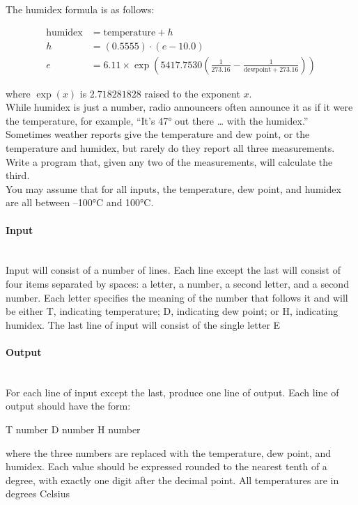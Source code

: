 \documentclass{article}
\begin{document}
The humidex formula is as follows: 

\begin{align*}
    \text{humidex} &= \text{temperature} + h \\
    h &= (0.5555) \cdot (e - 10.0) \\
    e &= 6.11 \times \exp \left( 5417.7530 \left( \frac{1}{273.16} - \frac{1}{\text{dewpoint} + 273.16} \right) \right)
\end{align*}

where \( \exp(x) \) is \( 2.718281828 \) raised to the exponent \( x \). \\

While humidex is just a number, radio announcers often announce it as if it were the temperature, for example, “It’s 47° out there … with the humidex.” Sometimes weather reports give the temperature and dew point, or the temperature and humidex, but rarely do they report all three
measurements. Write a program that, given any two of the measurements, will calculate the third.\\
You may assume that for all inputs, the temperature, dew point, and humidex are all between
–100°C and 100°C.


\paragraph{Input} \mbox{} \\

Input will consist of a number of lines. Each line except the last will consist of four items separated
by spaces: a letter, a number, a second letter, and a second number. Each letter specifies the meaning of the number that follows it and will be either T, indicating temperature; D, indicating dew
point; or H, indicating humidex. The last line of input will consist of the single letter E

\paragraph{Output}\mbox{} \\

For each line of input except the last, produce one line of output. Each line of output should have
the form:
\begin{center}
T number D number H number
\end{center}
where the three numbers are replaced with the temperature, dew point, and humidex. Each value
should be expressed rounded to the nearest tenth of a degree, with exactly one digit after the decimal point. All temperatures are in degrees Celsius
\end{document}
